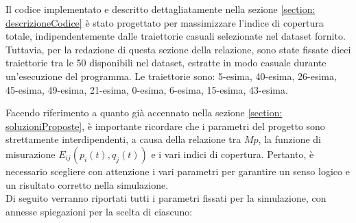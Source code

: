 \documentclass[twoside]{article}
\begin{document}
Il codice implementato e descritto dettagliatamente nella sezione \ref{section: descrizioneCodice} è stato progettato per massimizzare l'indice di copertura totale, indipendentemente dalle traiettorie casuali selezionate nel dataset fornito. Tuttavia, per la redazione di questa sezione della relazione, sono state fissate dieci traiettorie tra le 50 disponibili nel dataset, estratte in modo casuale durante un'esecuzione del programma. Le traiettorie sono: 5-esima, 40-esima, 26-esima, 45-esima, 49-esima, 21-esima, 0-esima, 6-esima, 15-esima, 43-esima.


\vspace{\baselineskip}

Facendo riferimento a quanto già accennato nella sezione \ref{section: soluzioniProposte}, è importante ricordare che i parametri del progetto sono strettamente interdipendenti, a causa della relazione tra \ensuremath{Mp}, la funzione di misurazione \ensuremath{E_{ij}(p_i(t), q_j(t))} e i vari indici di copertura. Pertanto, è necessario scegliere con attenzione i vari parametri per garantire un senso logico e un risultato corretto nella simulazione.\\
Di seguito verranno riportati tutti i parametri fissati per la simulazione, con annesse spiegazioni per la scelta di ciascuno:
\end{document}
